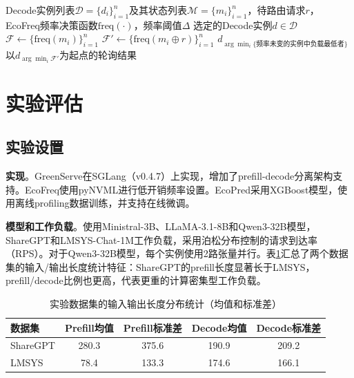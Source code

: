\begin{algorithm}[!t]
\caption{EcoRoute：Decode请求状态空间路由}
\label{alg:ecoroute}
\begin{algorithmic}[1]
    \REQUIRE Decode实例列表$\mathcal{D}=\{d_i\}_{i=1}^n$及其状态列表$\mathcal{M}=\{m_i\}_{i=1}^n$，待路由请求$r$，EcoFreq频率决策函数$\mathrm{freq}(\cdot)$，频率阈值$\Delta$
    \ENSURE 选定的Decode实例$d \in \mathcal{D}$
    \STATE $\mathcal{F} \leftarrow \{\mathrm{freq}(m_i)\}_{i=1}^n$ \hfill{}
    \STATE $\mathcal{F}' \leftarrow \{\mathrm{freq}(m_i \oplus r)\}_{i=1}^n$ \hfill{}
        \RETURN $d_{\arg\min_i \{\text{频率未变的实例中负载最低者}\}}$ \hfill{}
    \ENDIF
    \RETURN 以$d_{\arg\min_i \mathcal{F}'}$为起点的轮询结果 \hfill{}
\end{algorithmic}
\end{algorithm}

\section{实验评估}

\subsection{实验设置}

\textbf{实现}。GreenServe在SGLang（v0.4.7）上实现，增加了prefill-decode分离架构支持。EcoFreq使用pyNVML进行低开销频率设置。EcoPred采用XGBoost模型，使用离线profiling数据训练，并支持在线微调。

\textbf{模型和工作负载}。使用Ministral-3B、LLaMA-3.1-8B和Qwen3-32B模型，ShareGPT和LMSYS-Chat-1M工作负载，采用泊松分布控制的请求到达率（RPS）。对于Qwen3-32B模型，每个实例使用2路张量并行。表\ref{tab:dataset-stats}汇总了两个数据集的输入/输出长度统计特征：ShareGPT的prefill长度显著长于LMSYS，prefill/decode比例也更高，代表更重的计算密集型工作负载。

\begin{table}[!t]
    \centering
    \caption{实验数据集的输入输出长度分布统计（均值和标准差）}
    \label{tab:dataset-stats}
    \begin{tabular}{l|cccc}
        \toprule
        \textbf{数据集} & \textbf{Prefill均值} & \textbf{Prefill标准差} & \textbf{Decode均值} & \textbf{Decode标准差} \\
        \midrule
        ShareGPT & 280.3 & 375.6 & 190.9 & 209.2 \\
        LMSYS    & 78.4  & 133.3 & 174.6 & 166.1 \\
        \bottomrule
    \end{tabular}
\end{table}


